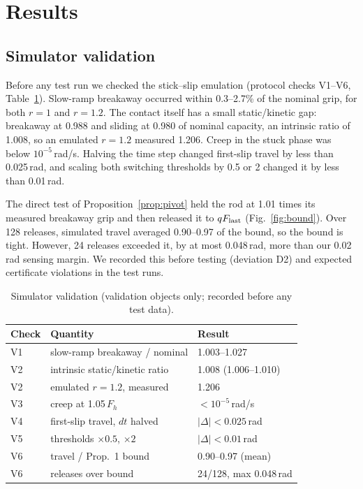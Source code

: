 \section{Results}\label{sec:results}
\subsection{Simulator validation}\label{sec:valid}
Before any test run we checked the stick--slip emulation (protocol checks V1--V6, Table~\ref{tab:valid}). Slow-ramp breakaway occurred within 0.3--2.7\% of the nominal grip, for both $r=1$ and $r=1.2$. The contact itself has a small static/kinetic gap: breakaway at 0.988 and sliding at 0.980 of nominal capacity, an intrinsic ratio of 1.008, so an emulated $r=1.2$ measured 1.206. Creep in the stuck phase was below $10^{-5}$\,rad/s. Halving the time step changed first-slip travel by less than 0.025\,rad, and scaling both switching thresholds by 0.5 or 2 changed it by less than 0.01\,rad.

The direct test of Proposition~\ref{prop:pivot} held the rod at 1.01 times its measured breakaway grip and then released it to $q F_{\rm last}$ (Fig.~\ref{fig:bound}). Over 128 releases, simulated travel averaged 0.90--0.97 of the bound, so the bound is tight. However, 24 releases exceeded it, by at most 0.048\,rad, more than our 0.02\,rad sensing margin. We recorded this before testing (deviation D2) and expected certificate violations in the test runs.

\begin{table}[t]\centering\footnotesize
\caption{Simulator validation (validation objects only; recorded before any test data).}\label{tab:valid}
\begin{tabular}{@{}lll@{}}\toprule
Check & Quantity & Result\\\midrule
V1 & slow-ramp breakaway / nominal & 1.003--1.027\\
V2 & intrinsic static/kinetic ratio & 1.008 (1.006--1.010)\\
V2 & emulated $r=1.2$, measured & 1.206\\
V3 & creep at 1.05\,$F_h$ & $<10^{-5}$\,rad/s\\
V4 & first-slip travel, $dt$ halved & $|\Delta|<0.025$\,rad\\
V5 & thresholds $\times0.5$, $\times2$ & $|\Delta|<0.01$\,rad\\
V6 & travel / Prop.~1 bound & 0.90--0.97 (mean)\\
V6 & releases over bound & 24/128, max 0.048\,rad\\\bottomrule
\end{tabular}
\end{table}

